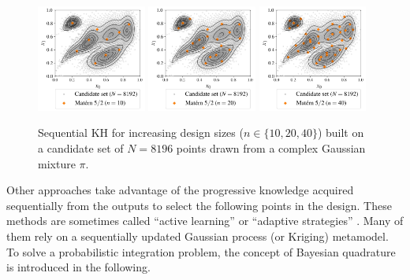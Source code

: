 \begin{figure}[!h]
\begin{center}
    \includegraphics[width=0.32\textwidth]{part2/figures/DCE/numerical_experiments/gaussian_mixture_sampling10.jpg}
    \includegraphics[width=0.32\textwidth]{part2/figures/DCE/numerical_experiments/gaussian_mixture_sampling20.jpg}
    \includegraphics[width=0.32\textwidth]{part2/figures/DCE/numerical_experiments/gaussian_mixture_sampling40.jpg}
\end{center}
\caption{Sequential KH for increasing design sizes ($n\in\{10, 20, 40\}$) built on a candidate set of $N=8196$ points drawn from a complex Gaussian mixture $\pi$.} \label{fig:KH_mixture}
\end{figure}

Other approaches take advantage of the progressive knowledge acquired sequentially from the outputs to select the following points in the design. 
These methods are sometimes called ``active learning'' or ``adaptive strategies'' \citep{fau_2021}. 
Many of them rely on a sequentially updated Gaussian process (or Kriging) metamodel. 
To solve a probabilistic integration problem, the concept of Bayesian quadrature is introduced in the following. 

